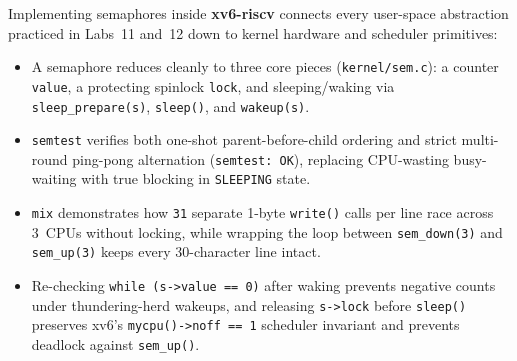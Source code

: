 \documentclass[12pt,a4paper]{article}
\begin{document}
Implementing semaphores inside \textbf{xv6-riscv} connects every user-space abstraction practiced in Labs~11 and~12 down to kernel hardware and scheduler primitives:
\begin{itemize}
    \item A semaphore reduces cleanly to three core pieces (\texttt{kernel/\allowbreak sem.c}): a counter \texttt{value}, a protecting spinlock \texttt{lock}, and sleeping/waking via \texttt{sleep\_\allowbreak prepare(s)}, \texttt{sleep()}, and \texttt{wakeup(s)}.
    \item \texttt{semtest} verifies both one-shot parent-before-child ordering and strict multi-round ping-pong alternation (\texttt{semtest: OK}), replacing CPU-wasting busy-waiting with true blocking in \texttt{SLEEPING} state.
    \item \texttt{mix} demonstrates how \texttt{31} separate 1-byte \texttt{write()} calls per line race across 3~CPUs without locking, while wrapping the loop between \texttt{sem\_\allowbreak down(3)} and \texttt{sem\_\allowbreak up(3)} keeps every 30-character line intact.
    \item Re-checking \texttt{while (s->value == 0)} after waking prevents negative counts under thundering-herd wakeups, and releasing \texttt{s->lock} before \texttt{sleep()} preserves xv6's \texttt{mycpu()->noff == 1} scheduler invariant and prevents deadlock against \texttt{sem\_\allowbreak up()}.
\end{itemize}
\end{document}
